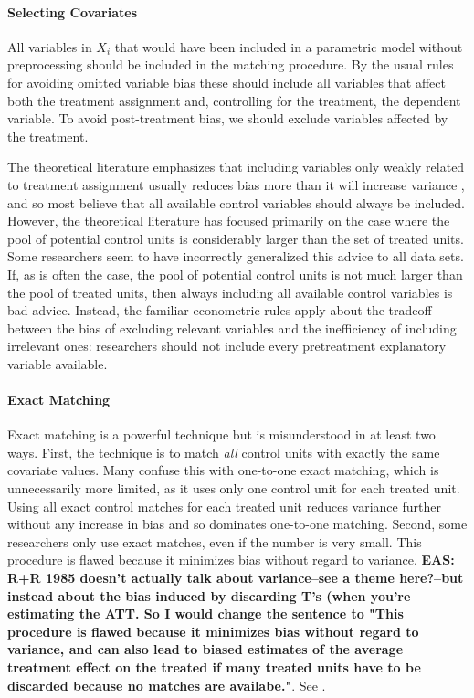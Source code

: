 \documentclass[11pt,titlepage]{article}
\begin{document}
\paragraph{Selecting Covariates}
All variables in $X_i$ that would have been included in a parametric
model without preprocessing should be included in the matching
procedure.  By the usual rules for avoiding omitted variable bias
these should include all variables that affect both the treatment
assignment and, controlling for the treatment, the dependent variable.
To avoid post-treatment bias, we should exclude variables affected by
the treatment.

The theoretical literature emphasizes that including variables only
weakly related to treatment assignment usually reduces bias more than
it will increase variance \citep{RubTho96, HecIchSmi98}, and so most
believe that all available control variables should always be
included.  However, the theoretical literature has focused primarily
on the case where the pool of potential control units is considerably
larger than the set of treated units.  Some researchers seem to
have incorrectly generalized this advice to all data sets.  If, as is
often the case, the pool of potential control units is not much larger
than the pool of treated units, then always including all available
control variables is bad advice.  Instead, the familiar econometric
rules apply about the tradeoff between the bias of excluding relevant
variables and the inefficiency of including irrelevant ones:
researchers should not include every pretreatment explanatory
variable available.

\paragraph{Exact Matching}  
Exact matching is a powerful technique but is misunderstood in at
least two ways.  First, the technique is to match \emph{all} control
units with exactly the same covariate values.  Many confuse this with
one-to-one exact matching, which is unnecessarily more limited, as it
uses only one control unit for each treated unit.  Using all exact
control matches for each treated unit reduces variance further without
any increase in bias and so dominates one-to-one matching.  Second,
some researchers only use exact matches, even if the number is very
small.  This procedure is flawed because it minimizes bias without
regard to variance.  {\bf EAS:  R+R 1985 doesn't actually talk about variance--see
a theme here?--but instead about the bias induced by discarding T's (when you're estimating
the ATT.  So I would change the sentence to "This procedure is flawed because it minimizes
bias without regard to variance, and can also lead to biased estimates of the average 
treatment effect on the treated if many treated units have to be discarded because
no matches are availabe."}.  See \citet{RosRub85b}.
\end{document}
